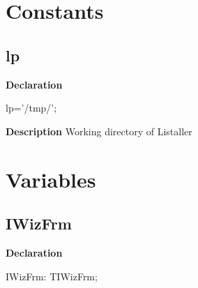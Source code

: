 \documentclass{report}
\newif\ifpdf
\begin{document}
\section{Constants}
\ifpdf
\subsection*{\large{\textbf{lp}}\normalsize\hspace{1ex}\hrulefill}
\else
\subsection*{lp}
\fi
\label{igobase-lp}
\begin{list}{}{
\setlength{\itemindent}{0cm}
\setlength{\listparindent}{0cm}
\setlength{\leftmargin}{\evensidemargin}
\addtolength{\leftmargin}{\tmplength}
\settowidth{\labelsep}{X}
\addtolength{\leftmargin}{\labelsep}
\setlength{\labelwidth}{\tmplength}
}
\item[\textbf{Declaration}\hfill]
\ifpdf
\begin{flushleft}
\fi
\begin{ttfamily}
lp='/tmp/';\end{ttfamily}

\ifpdf
\end{flushleft}
\fi

\par
\item[\textbf{Description}]
Working directory of Listaller

\end{list}
\section{Variables}
\ifpdf
\subsection*{\large{\textbf{IWizFrm}}\normalsize\hspace{1ex}\hrulefill}
\else
\subsection*{IWizFrm}
\fi
\label{igobase-IWizFrm}
\begin{list}{}{
\setlength{\itemindent}{0cm}
\setlength{\listparindent}{0cm}
\setlength{\leftmargin}{\evensidemargin}
\addtolength{\leftmargin}{\tmplength}
\settowidth{\labelsep}{X}
\addtolength{\leftmargin}{\labelsep}
\setlength{\labelwidth}{\tmplength}
}
\item[\textbf{Declaration}\hfill]
\ifpdf
\begin{flushleft}
\fi
\begin{ttfamily}
IWizFrm: TIWizFrm;\end{ttfamily}

\ifpdf
\end{flushleft}
\fi

\end{list}
\ifpdf
\end{document}
